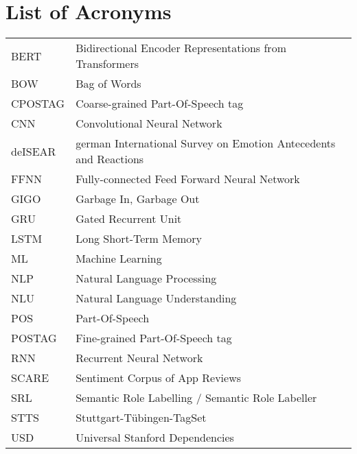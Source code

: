{}
\chapter*{List of Acronyms}

\begin{supertabular}{lp{12.5cm}}
BERT    & Bidirectional Encoder Representations from Transformers\\
BOW     & Bag of Words\\
CPOSTAG & Coarse-grained Part-Of-Speech tag\\
CNN     & Convolutional Neural Network\\
deISEAR & german International Survey on Emotion Antecedents and Reactions\\
FFNN    & Fully-connected Feed Forward Neural Network\\
GIGO    & Garbage In, Garbage Out\\
GRU     & Gated Recurrent Unit\\
LSTM    & Long Short-Term Memory\\
ML      & Machine Learning\\
NLP     & Natural Language Processing\\
NLU     & Natural Language Understanding\\
POS     & Part-Of-Speech\\
POSTAG  & Fine-grained Part-Of-Speech tag\\
RNN     & Recurrent Neural Network\\
SCARE   & Sentiment Corpus of App Reviews\\
SRL     & Semantic Role Labelling / Semantic Role Labeller\\
STTS    & Stuttgart-Tübingen-TagSet\\
USD     & Universal Stanford Dependencies\\
\end{supertabular}

\newpage
